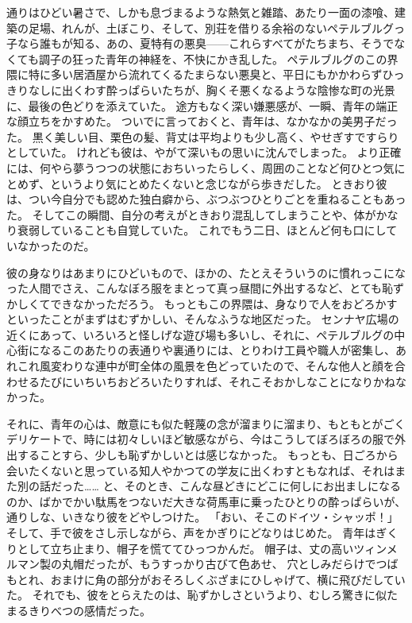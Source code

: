 通りはひどい暑さで、しかも息づまるような熱気と雑踏、あたり一面の漆喰、建築の足場、れんが、土ぼこり、そして、別荘を借りる余裕のないペテルブルグっ子なら誰もが知る、あの、夏特有の悪臭——これらすべてがたちまち、そうでなくても調子の狂った青年の神経を、不快にかき乱した。
ペテルブルグのこの界隈に特に多い居酒屋から流れてくるたまらない悪臭と、平日にもかかわらずひっきりなしに出くわす酔っぱらいたちが、胸くそ悪くなるような陰惨な町の光景に、最後の色どりを添えていた。
途方もなく深い嫌悪感が、一瞬、青年の端正な顔立ちをかすめた。
ついでに言っておくと、青年は、なかなかの美男子だった。
黒く美しい目、栗色の髪、背丈は平均よりも少し高く、やせぎすですらりとしていた。
けれども彼は、やがて深いもの思いに沈んでしまった。
より正確には、何やら夢うつつの状態におちいったらしく、周囲のことなど何ひとつ気にとめず、というより気にとめたくないと念じながら歩きだした。
ときおり彼は、つい今自分でも認めた独白癖から、ぶつぶつひとりごとを重ねることもあった。
そしてこの瞬間、自分の考えがときおり混乱してしまうことや、体がかなり衰弱していることも自覚していた。
これでもう二日、ほとんど何も口にしていなかったのだ。

彼の身なりはあまりにひどいもので、ほかの、たとえそういうのに慣れっこになった人間でさえ、こんなぼろ服をまとって真っ昼間に外出するなど、とても恥ずかしくてできなかっただろう。
もっともこの界隈は、身なりで人をおどろかすといったことがまずはむずかしい、そんなふうな地区だった。
センナヤ広場の近くにあって、いろいろと怪しげな遊び場も多いし、それに、ペテルブルグの中心街になるこのあたりの表通りや裏通りには、とりわけ工員や職人が密集し、あれこれ風変わりな連中が町全体の風景を色どっていたので、そんな他人と顔を合わせるたびにいちいちおどろいたりすれば、それこそおかしなことになりかねなかった。

それに、青年の心は、敵意にも似た軽蔑の念が溜まりに溜まり、もともとがごくデリケートで、時には初々しいほど敏感ながら、今はこうしてぼろぼろの服で外出することすら、少しも恥ずかしいとは感じなかった。
もっとも、日ごろから会いたくないと思っている知人やかつての学友に出くわすともなれば、それはまた別の話だった……
と、そのとき、こんな昼どきにどこに何しにお出ましになるのか、ばかでかい駄馬をつないだ大きな荷馬車に乗ったひとりの酔っぱらいが、通りしな、いきなり彼をどやしつけた。
「おい、そこのドイツ・シャッポ！」
そして、手で彼をさし示しながら、声をかぎりにどなりはじめた。
青年はぎくりとして立ち止まり、帽子を慌ててひっつかんだ。
帽子は、丈の高いツィンメルマン製の丸帽だったが、もうすっかり古びて色あせ、
穴としみだらけでつばもとれ、おまけに角の部分がおそろしくぶざまにひしゃげて、横に飛びだしていた。
それでも、彼をとらえたのは、恥ずかしさというより、むしろ驚きに似たまるきりべつの感情だった。


